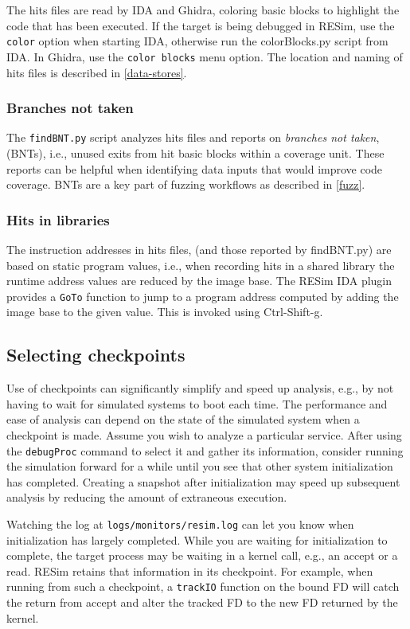\documentclass[titlepage]{article}
\begin{document}
The hits files are read by IDA and Ghidra, coloring basic blocks to highlight the code that has been executed. If the target is being debugged in RESim,
use the {\tt color} option when starting IDA, otherwise run the colorBlocks.py script from IDA.  In Ghidra, use the {\tt color blocks} menu option.
The location and naming of hits files is described in \ref{data-stores}.

\subsubsection{Branches not taken}
The {\tt findBNT.py} script analyzes hits files and reports on \textit{branches not taken}, (BNTs), i.e., unused exits from hit basic blocks within a coverage unit.
These reports can be helpful when identifying data inputs that would improve code coverage.  BNTs are a key part of fuzzing workflows as described in \ref{fuzz}.

\subsubsection{Hits in libraries}
The instruction addresses in hits files, (and those reported by findBNT.py) are based on static program values, i.e., when recording hits 
in a shared library the runtime address values are reduced by the image base. 
The RESim IDA plugin provides a {\tt GoTo} function to jump to a program address computed by adding the image base to the given value.  This is invoked using Ctrl-Shift-g.

\subsection{Selecting checkpoints}
Use of checkpoints can significantly simplify and speed up analysis, e.g., by not having to wait for simulated systems to boot each time.
The performance and ease of analysis can depend on the state of the simulated system when a checkpoint is made.  Assume you wish to analyze 
a particular service. After using the {\tt debugProc} command to select it and gather its information, consider running the simulation
forward for a while until you see that other system initialization has completed.  Creating a snapshot after initialization may speed up
subsequent analysis by reducing the amount of extraneous execution.  

Watching the log at {\tt logs/monitors/resim.log} can let you know when initialization has largely completed.
While you are waiting for initialization to complete, the target process may be waiting in a kernel call, e.g., an accept or a read.
RESim retains that information in its checkpoint.  For example, when running from such a checkpoint, a {\tt trackIO} function on the bound FD 
will catch the return from accept and alter the tracked FD to the new FD returned by the kernel.
\end{document}
